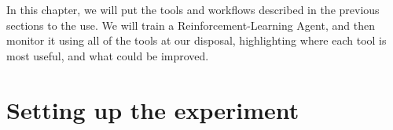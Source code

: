 \label{ch:AnalyzingGraphs}

\begin{jointwork}
	In this chapter, we will put the tools and workflows described in the previous sections to the use. We will train a Reinforcement-Learning Agent, and then monitor it using all of the tools at our disposal, highlighting where each tool is most useful, and what could be improved.
\end{jointwork}

\section*{Setting up the experiment}




